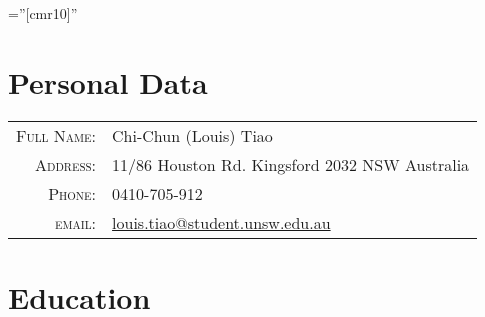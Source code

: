 \documentclass[a4paper,10pt]{article} %
\begin{document}
\pagestyle{empty} %

\font\fb=''[cmr10]'' %


\par{\bigskip\par} %

\section{Personal Data}

\begin{tabular}{rl}
\textsc{Full Name:} & Chi-Chun (Louis) Tiao\\
\textsc{Address:} & 11/86 Houston Rd. Kingsford 2032 NSW Australia \\
\textsc{Phone:} & 0410-705-912 \\
\textsc{email:} & \href{mailto:louis.tiao@student.unsw.edu.au}
  {louis.tiao@student.unsw.edu.au}
\end{tabular}


\section{Education}
\end{document}
